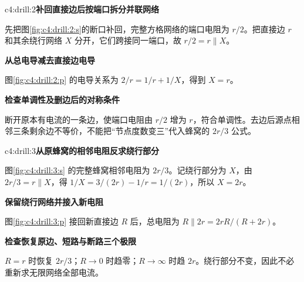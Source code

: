 \begin{drillsolution}{c4:drill:2}\textbf{补回直接边后按端口拆分并联网络}\par\nobreak
先把图\ref{fig:c4:drill:2:s}的断口补回，完整方格网络的端口电阻为 $r/2$。把直接边 $r$ 和其余绕行网络 $X$ 分开，它们跨接同一端口，故 $r/2=r\parallel X$。



\par\medskip{}\noindent\textbf{从总电导减去直接边电导}\par\nobreak
图\ref{fig:c4:drill:2:p} 的电导关系为 $2/r=1/r+1/X$，得到 $X=r$。

\par\medskip{}\noindent\textbf{检查单调性及删边后的对称条件}\par\nobreak
断开原本有电流的一条边，使端口电阻由 $r/2$ 增为 $r$，符合单调性。去边后源点相邻三条剩余边不等价，不能把“节点度数变三”代入蜂窝的 $2r/3$ 公式。\end{drillsolution}
\begin{drillsolution}{c4:drill:3}\textbf{从原蜂窝的相邻电阻反求绕行部分}\par\nobreak
图\ref{fig:c4:drill:3:s} 的完整蜂窝相邻电阻为 $2r/3$。记绕行部分为 $X$，由 $2r/3=r\parallel X$，得 $1/X=3/(2r)-1/r=1/(2r)$，所以 $X=2r$。



\par\medskip{}\noindent\textbf{保留绕行网络并接入新电阻}\par\nobreak
图\ref{fig:c4:drill:3:p} 接回新直接边 $R$ 后，总电阻为 $R\parallel2r=2rR/(R+2r)$。

\par\medskip{}\noindent\textbf{检查恢复原边、短路与断路三个极限}\par\nobreak
$R=r$ 时恢复 $2r/3$；$R\to0$ 时趋零；$R\to\infty$ 时趋 $2r$。绕行部分不变，因此不必重新求无限网络全部电流。\end{drillsolution}
